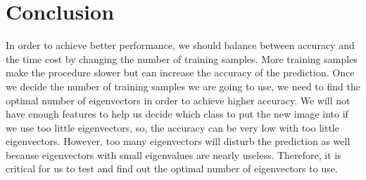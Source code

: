 \documentclass[UTF8,12pt]{article}
\begin{document}
	\section{Conclusion}
	In order to achieve better performance, we should balance between accuracy and the time cost by changing the number of training samples. More training samples make the procedure slower but can increase the accuracy of the prediction. Once we decide the number of training samples we are going to use, we need to find the optimal number of eigenvectors in order to achieve higher accuracy. We will not have enough features to help us decide which class to put the new image into if we use too little eigenvectors, so, the accuracy can be very low with too little eigenvectors. However, too many eigenvectors will disturb the prediction as well because eigenvectors with small eigenvalues are nearly useless. Therefore, it is critical for us to test and find out the optimal number of eigenvectors to use. 
\end{document}
